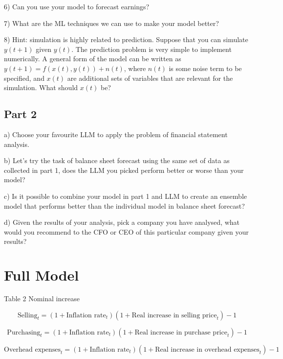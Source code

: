 \documentclass[12pt]{article}
\numberwithin{equation}{section}
\begin{document}
6) Can you use your model to forecast earnings?

7) What are the ML techniques we can use to make your model better?

8) Hint: simulation is highly related to prediction. Suppose that you can simulate \(y(t+1)\) given \(y(t)\). The prediction problem is very simple to implement numerically. A general form of the model can be written as \(y(t+1) = f(x(t), y(t)) + n(t)\), where \(n(t)\) is some noise term to be specified, and \(x(t)\) are additional sets of variables that are relevant for the simulation. What should \(x(t)\) be? 

\subsection*{Part 2}

a) Choose your favourite LLM to apply the problem of financial statement analysis.

b) Let’s try the task of balance sheet forecast using the same set of data as collected in part 1, does the LLM you picked perform better or worse than your model?

c) Is it possible to combine your model in part 1 and LLM to create an ensemble model that performs better than the individual model in balance sheet forecast?

d) Given the results of your analysis, pick a company you have analysed, what would you recommend to the CFO or CEO of this particular company given your results?

\section*{Full Model}
\label{Full Model}
Table 2 Nominal increase

\begin{equation}
	\text{Selling}_{t} = (1 + \text{Inflation rate}_{t})(1+\text{Real increase in selling price}_{t})-1
\end{equation}


\begin{equation}
	\text{Purchasing}_{t} = (1 + \text{Inflation rate}_{t})(1+\text{Real increase in purchase price}_{t})-1
\end{equation}

\begin{equation}
	\text{Overhead expenses}_{t} = (1 + \text{Inflation rate}_{t})(1+\text{Real increase in overhead expenses}_{t})-1
\end{equation}
\end{document}
